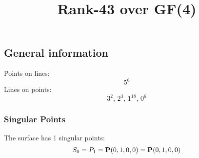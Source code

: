 \documentclass{article}
\newcommand\setTBstruts{\def\T{\rule{0pt}{2.6ex}}%
\def\B{\rule[-1.2ex]{0pt}{0pt}}}
\newcommand{\bP}{{\bf P}}
\begin{document}
 
\setTBstruts



{\allowdisplaybreaks%






\title{Rank-43 over GF(4)}
\author{}%
\maketitle%
%
{}



\subsection*{General information}
Points on lines:
$$
5^6$$
Lines on points:
$$
3^2,\,2^3,\,1^{18},\,0^6$$
\subsubsection*{Singular Points}
The surface has 1 singular points:\\
\begin{align*}
S_{0} &= P_{1}=\bP(0, 1, 0, 0) = \bP(0, 1, 0, 0)\\
\end{align*}
}
\end{document}

